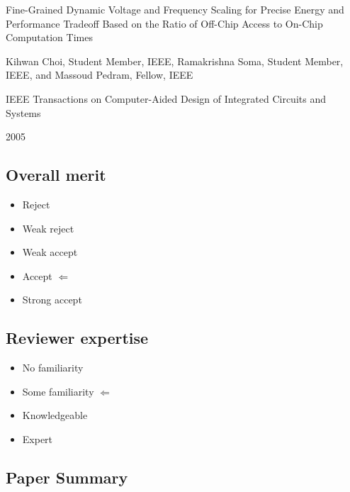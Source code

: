 \documentclass[11pt,letterpaper]{article}
\begin{document}
	\noindent {\bf \textcolor{blue}{Paper Title: }}
	Fine-Grained Dynamic Voltage and Frequency Scaling for Precise Energy and Performance Tradeoff Based on the Ratio of Off-Chip Access to On-Chip Computation Times
	
	\noindent {\bf \textcolor{blue}{Author(s): }}
	Kihwan Choi, Student Member, IEEE, Ramakrishna Soma, Student Member, IEEE, and Massoud Pedram, Fellow, IEEE
	
	\noindent {\bf \textcolor{blue}{Conference/Journal: }}
	IEEE Transactions on Computer-Aided Design of Integrated Circuits and Systems
	
	\noindent {\bf \textcolor{blue}{Year of Publication: }}
	2005
	
	\noindent\makebox[\linewidth]{\rule{\textwidth}{0.4pt}}
	
	\subsection*{Overall merit}
	
	\begin{itemize}[noitemsep]
		\item Reject 
		\item Weak reject
		\item Weak accept
		\item Accept $\Leftarrow$
		\item Strong accept 
	\end{itemize}
	
	\subsection*{Reviewer expertise}
	
	\begin{itemize}[noitemsep]
		\item No familiarity 
		\item Some familiarity $\Leftarrow$
		\item Knowledgeable
		\item Expert 
	\end{itemize}
	
	\subsection*{Paper Summary}
	
\end{document}
